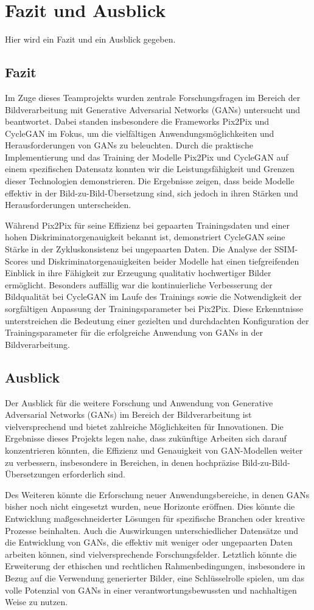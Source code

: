 \chapter{Fazit und Ausblick}
Hier wird ein Fazit und ein Ausblick gegeben.

\section{Fazit}
Im Zuge dieses Teamprojekts wurden zentrale Forschungsfragen im Bereich der Bildverarbeitung mit Generative Adversarial Networks (GANs) untersucht und beantwortet. Dabei standen insbesondere die Frameworks Pix2Pix und CycleGAN im Fokus, um die vielfältigen Anwendungsmöglichkeiten und Herausforderungen von GANs zu beleuchten. Durch die praktische Implementierung und das Training der Modelle Pix2Pix und CycleGAN auf einem spezifischen Datensatz konnten wir die Leistungsfähigkeit und Grenzen dieser Technologien demonstrieren. Die Ergebnisse zeigen, dass beide Modelle effektiv in der Bild-zu-Bild-Übersetzung sind, sich jedoch in ihren Stärken und Herausforderungen unterscheiden.

Während Pix2Pix für seine Effizienz bei gepaarten Trainingsdaten und einer hohen Diskriminatorgenauigkeit bekannt ist, demonstriert CycleGAN seine Stärke in der Zykluskonsistenz bei ungepaarten Daten. Die Analyse der SSIM-Scores und Diskriminatorgenauigkeiten beider Modelle hat einen tiefgreifenden Einblick in ihre Fähigkeit zur Erzeugung qualitativ hochwertiger Bilder ermöglicht. Besonders auffällig war die kontinuierliche Verbesserung der Bildqualität bei CycleGAN im Laufe des Trainings sowie die Notwendigkeit der sorgfältigen Anpassung der Trainingsparameter bei Pix2Pix. Diese Erkenntnisse unterstreichen die Bedeutung einer gezielten und durchdachten Konfiguration der Trainingsparameter für die erfolgreiche Anwendung von GANs in der Bildverarbeitung.

\section{Ausblick}
Der Ausblick für die weitere Forschung und Anwendung von Generative Adversarial Networks (GANs) im Bereich der Bildverarbeitung ist vielversprechend und bietet zahlreiche Möglichkeiten für Innovationen. Die Ergebnisse dieses Projekts legen nahe, dass zukünftige Arbeiten sich darauf konzentrieren könnten, die Effizienz und Genauigkeit von GAN-Modellen weiter zu verbessern, insbesondere in Bereichen, in denen hochpräzise Bild-zu-Bild-Übersetzungen erforderlich sind.

Des Weiteren könnte die Erforschung neuer Anwendungsbereiche, in denen GANs bisher noch nicht eingesetzt wurden, neue Horizonte eröffnen. Dies könnte die Entwicklung maßgeschneiderter Lösungen für spezifische Branchen oder kreative Prozesse beinhalten. Auch die Auswirkungen unterschiedlicher Datensätze und die Entwicklung von GANs, die effektiv mit weniger oder ungepaarten Daten arbeiten können, sind vielversprechende Forschungsfelder. Letztlich könnte die Erweiterung der ethischen und rechtlichen Rahmenbedingungen, insbesondere in Bezug auf die Verwendung generierter Bilder, eine Schlüsselrolle spielen, um das volle Potenzial von GANs in einer verantwortungsbewussten und nachhaltigen Weise zu nutzen.
